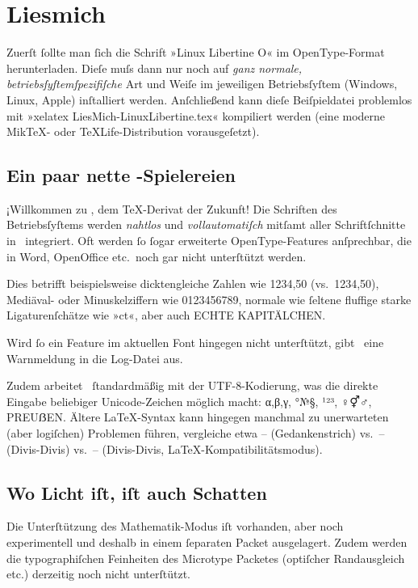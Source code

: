 ﻿\documentclass{scrartcl}
\begin{document}
\section*{Liesmich}
Zuerſt ſollte man ſich die Schrift »Linux Libertine O« im OpenType-Format herunterladen. Dieſe muſs dann nur noch auf \emph{ganz normale, betriebsſyſtemſpezifiſche} Art und Weiſe im jeweiligen Betriebsſyſtem (Windows, Linux, Apple) inſtalliert werden. Anſchließend kann dieſe Beiſpieldatei problemlos mit »xelatex LiesMich-LinuxLibertine.tex« kompiliert werden (eine moderne Mik\TeX- oder \TeX Life-Distribution vorausgeſetzt).


\subsection*{Ein paar nette \XeLaTeX-Spielereien}
¡Willkommen zu \XeLaTeX, dem \TeX-Derivat der Zukunft! Die Schriften des Betriebsſyſtems werden \emph{nahtlos} und \emph{vollautomatiſch} mitſamt aller Schriftſchnitte in \XeTeX\ integriert. Oft werden ſo ſogar erweiterte OpenType-Features anſprechbar, die in Word, OpenOffice etc.\ noch gar nicht unterſtützt werden.

Dies betrifft beispielsweise dicktengleiche Zahlen wie {1234,50} (vs.\ 1234,50), Mediäval- oder Minuskelziffern wie {0123456789}, normale wie ſeltene {fluffige starke Ligaturenſchätze wie »ct«}, aber auch {ECHTE KAPITÄLCHEN}.


Wird ſo ein Feature im aktuellen Font hingegen nicht unterſtützt, gibt \XeTeX\ eine Warnmeldung in die Log-Datei aus.

Zudem arbeitet \XeLaTeX\ ſtandardmäßig mit der UTF-8-Kodierung, was die direkte Eingabe beliebiger Unicode-Zeichen möglich macht: α,β,γ, °№§, ¹²³, ♀⚥♂, PREUẞEN. Ältere \LaTeX-Syntax kann hingegen manchmal zu unerwarteten (aber logiſchen) Problemen führen, vergleiche etwa – (Gedankenstrich) vs.\ -- (Divis-Divis) vs.\ {-- (Divis-Divis, \LaTeX-Kompatibilitätsmodus)}.


\subsection*{Wo Licht iſt, iſt auch Schatten}
Die Unterſtützung des Mathematik-Modus iſt vorhanden, aber noch experimentell und deshalb in einem ſeparaten Packet ausgelagert. Zudem werden die typographiſchen Feinheiten des Microtype Packetes (optiſcher Randausgleich etc.) derzeitig noch nicht unterſtützt.
\end{document}

